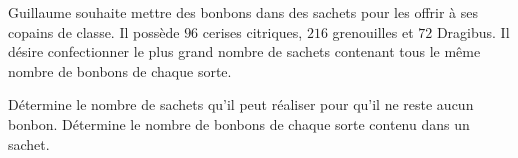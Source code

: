 %
%
Guillaume souhaite mettre des bonbons dans des sachets pour les offrir à ses copains de classe. Il possède $96$ cerises citriques, $216$ grenouilles et $72$ Dragibus. Il désire confectionner le plus grand nombre de sachets contenant tous le même nombre de bonbons de chaque sorte.
    \begin{tasks}
        \task Détermine le nombre de sachets qu'il peut réaliser pour qu'il ne reste aucun bonbon.
        \task Détermine le nombre de bonbons de chaque sorte contenu dans un sachet.
    \end{tasks}
